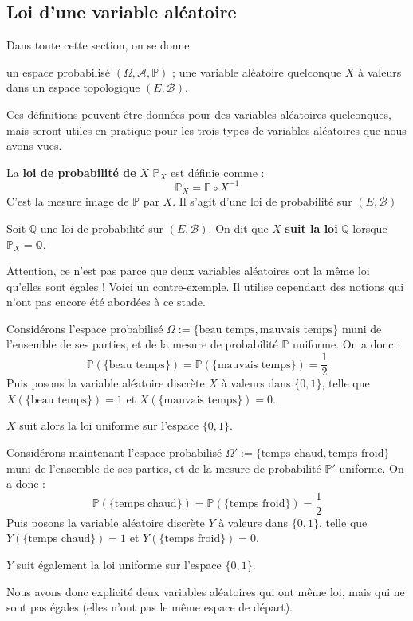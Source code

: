 \documentclass[../integ-proba.tex]{subfiles}
\begin{document}
\subsection{Loi d'une variable aléatoire}

Dans toute cette section, on se donne
\begin{itemize}
    \itemb un espace probabilisé $\left(\Omega, \mathcal{A}, \mathbb{P}\right)$ ;
    \itemb une variable aléatoire quelconque $X$ à valeurs dans un espace topologique $\left(E, \mathcal{B}\right)$.
\end{itemize}

Ces définitions peuvent être données pour des variables aléatoires quelconques, mais seront utiles en pratique pour les trois types de variables aléatoires que nous avons vues.

\begin{defi}
    La \textbf{loi de probabilité de} $X$ $\mathbb{P}_X$ est définie comme :
    $$
    \mathbb{P}_X=\mathbb{P} \circ X^{-1}
    $$
    C'est la mesure image de $\mathbb{P}$ par $X$.
    Il s'agit d'une loi de probabilité sur $\left(E, \mathcal{B} \right)$
\end{defi}

\begin{defi}
    Soit $\mathbb{Q}$ une loi de probabilité sur $\left(E, \mathcal{B} \right)$.
    On dit que $X$ \textbf{suit la loi} $\mathbb{Q}$ lorsque $\mathbb{P}_X = \mathbb{Q}$.
\end{defi}

\begin{rem}
    Attention, ce n'est pas parce que deux variables aléatoires ont la même loi qu'elles sont égales !
    Voici un contre-exemple. Il utilise cependant des notions qui n'ont pas encore été abordées à ce stade.
    
    Considérons l'espace probabilisé $\Omega := \{\text{beau temps}, \text{mauvais temps}\}$ muni de l'ensemble de ses parties, et de la mesure de probabilité $\mathbb{P}$ uniforme.
    On a donc :
    $$
    \mathbb{P}(\{\text{beau temps}\}) = \mathbb{P}(\{\text{mauvais temps}\}) = \frac{1}{2}
    $$
    Puis posons la variable aléatoire discrète $X$ à valeurs dans $\{0,1\}$, telle que $X(\{\text{beau temps}\})=1$ et $X(\{\text{mauvais temps}\})=0$.
    
    $X$ suit alors la loi uniforme sur l'espace $\{0,1\}$.

    Considérons maintenant l'espace probabilisé $\Omega' := \{\text{temps chaud}, \text{temps froid}\}$ muni de l'ensemble de ses parties, et de la mesure de probabilité $\mathbb{P}'$ uniforme.
    On a donc :
    $$
    \mathbb{P}(\{\text{temps chaud}\}) = \mathbb{P}(\{\text{temps froid}\}) = \frac{1}{2}
    $$
    Puis posons la variable aléatoire discrète $Y$ à valeurs dans $\{0,1\}$, telle que $Y(\{\text{temps chaud}\})=1$ et $Y(\{\text{temps froid}\})=0$.

    $Y$ suit également la loi uniforme sur l'espace $\{0,1\}$.

    Nous avons donc explicité deux variables aléatoires qui ont même loi, mais qui ne sont pas égales (elles n'ont pas le même espace de départ).
\end{rem}
\end{document}
